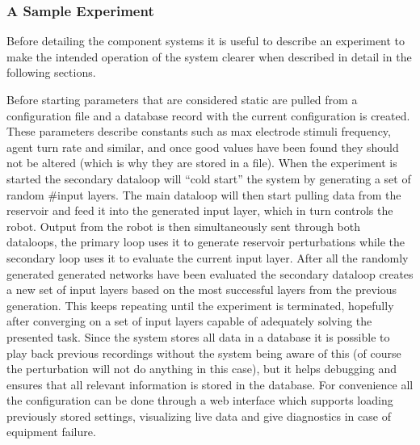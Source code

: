 \subsubsection{A Sample Experiment}
Before detailing the component systems it is useful to describe an experiment to
make the intended operation of the system clearer when described in detail in
the following sections.\par
Before starting parameters that are considered static are pulled from a
configuration file and a database record with the current configuration is
created.
These parameters describe constants such as max electrode stimuli frequency,
agent turn rate and similar, and once good values have been found they should
not be altered (which is why they are stored in a file).
When the experiment is started the secondary dataloop will ``cold start'' the
system by generating a set of random #input layers. The main dataloop will then start
pulling data from the reservoir and feed it into the generated input layer,
which in turn controls the robot.
Output from the robot is then simultaneously sent through both dataloops, the
primary loop uses it to generate reservoir perturbations while the secondary
loop uses it to evaluate the current input layer.
After all the randomly generated generated networks have been evaluated the
secondary dataloop creates a new set of input layers based on the most
successful layers from the previous generation.
This keeps repeating until the experiment is terminated, hopefully after
converging on a set of input layers capable of adequately solving the presented
task.
Since the system stores all data in a database it is possible to play back
previous recordings without the system being aware of this (of course the
perturbation will not do anything in this case), but it helps debugging and
ensures that all relevant information is stored in the database.
For convenience all the configuration can be done through a web interface which
supports loading previously stored settings, visualizing live data and give
diagnostics in case of equipment failure. 
